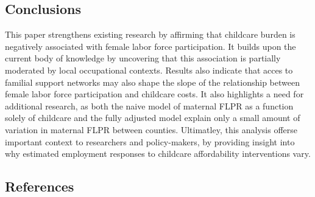 \documentclass[
  letterpaper,
  DIV=11,
  numbers=noendperiod]{scrartcl}
\begin{document}
\subsection{Conclusions}\label{conclusions}

This paper strengthens existing research by affirming that childcare
burden is negatively associated with female labor force participation.
It builds upon the current body of knowledge by uncovering that this
association is partially moderated by local occupational contexts.
Results also indicate that acces to familial support networks may also
shape the slope of the relationship between female labor force
participation and childcare costs. It also highlights a need for
additional research, as both the naive model of maternal FLPR as a
function solely of childcare and the fully adjusted model explain only a
small amount of variation in maternal FLPR between counties. Ultimatley,
this analysis offerse important context to researchers and
policy-makers, by providing insight into why estimated employment
responses to childcare affordability interventions vary.

\subsection{References}\label{references}
\end{document}
